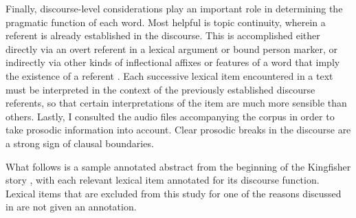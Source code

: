 Finally, discourse-level considerations play an important role in determining the pragmatic function of each word. Most helpful is topic continuity, wherein a referent is already established in the discourse. This is accomplished either directly via an overt referent in a lexical argument or bound person marker, or indirectly via other kinds of inflectional affixes or features of a word that imply the existence of a referent . Each successive lexical item encountered in a text must be interpreted in the context of the previously established discourse referents, so that certain interpretations of the item are much more sensible than others. Lastly, I consulted the audio files accompanying the corpus in order to take prosodic information into account. Clear prosodic breaks in the discourse are a strong sign of clausal boundaries.

What follows is a sample annotated abstract from the beginning of the Kingfisher story \parencite{Louie2003}, with each relevant lexical item annotated for its discourse function. Lexical items that are excluded from this study for one of the reasons discussed in  are not given an annotation.

